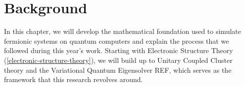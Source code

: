 \chapter{Background}%
\label{background}

In this chapter, we will develop the mathematical foundation used to simulate fermionic systems on quantum computers and explain the process that we followed during this year's work. Starting with Electronic Structure Theory (\ref{electronic-structure-theory}), we will build up to Unitary Coupled Cluster theory and the Variational Quantum Eigensolver REF, which serves as the framework that this research revolves around.

